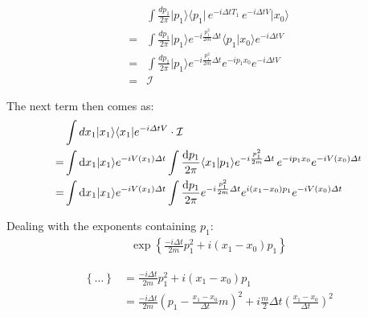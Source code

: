\documentclass[12pt,a4paper]{article}
\newcommand{\ket}[1]{{ |#1 \rangle}}
\newcommand{\bra}[1]{{\langle#1|}}
\numberwithin{equation}{section}
\begin{document}




\begin{align}
&\int \frac{dp_1}{2\pi} \ket{p_1}\bra{p_1} \, e^{-i\Delta t T_1}\, e^{-i\Delta t V} \ket{x_0} \\
= &\int \frac{dp_1}{2\pi} \ket{p_1} e^{-i \frac{p_1^2}{2m} \Delta t }\bra{p_1}x_0\rangle e^{-i\Delta t V} \\
= &\int \frac{dp_1}{2\pi} \ket{p_1} e^{-i \frac{p_1^2}{2m} \Delta t } e^{-i p_1 x_0}e^{-i\Delta t V} \\
= &\mathcal{I}
\end{align}

The next term then comes as:
\begin{align} \label{eq1:22}
&\int dx_1 \ket{x_1}\bra{x_1} e^{-i\Delta t V} \cdot \mathcal{I} \\
= &\int {\rm{d}}x_1 \ket{x_1} e^{-i V(x_1 ) \Delta t} \int \frac{{\rm{d}}p_1}{2\pi} \bra{x_1} p_1 \rangle e^{-i \frac{p_1^2}{2m} \Delta t} \, e^{-i p_1 x_0} e^{-i V(x_0) \Delta t}\\
= &\int {\rm{d}}x_1 \ket{x_1} e^{-i V(x_1 ) \Delta t} \int \frac{{\rm{d}}p_1}{2\pi} e^{-i \frac{p_1^2}{2m} \Delta t} e^{i (x_1 - x_0) p_1} e^{-i V(x_0) \Delta t}
\end{align}

Dealing with the exponents containing $p_1$:
\begin{align}
\exp\left\lbrace \frac{-i\Delta t }{2m}p_1^2 + i(x_1 - x_0) p_1 \right\rbrace
\end{align}

\begin{align} \label{eq1:27}
\left\lbrace \dots \right\rbrace &= \frac{-i\Delta t }{2m}p_1^2 + i(x_1 - x_0) p_1 \\
&= \frac{-i\Delta t }{2m} \left( p_1 - \frac{x_1 - x_0}{\Delta t} m \right)^2 + i\frac{m}{2} \Delta t \left( \frac{x_1 - x_0}{\Delta t}\right)^2 \\
\end{align}
\end{document}
